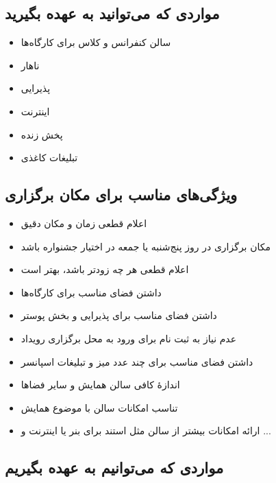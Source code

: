\documentclass{article}
\begin{document}
\subsection{مواردی که می‌توانید به عهده بگیرید}


\begin{flushright}

\begin{itemize}
\item سالن کنفرانس و کلاس برای کارگاه‌ها
\item ناهار
\item پذیرایی
\item اینترنت
\item پخش زنده
\item تبلیغات کاغذی
\end{itemize}

\end{flushright}


\subsection{ویژگی‌های مناسب برای مکان برگزاری}


\begin{flushright}

\begin{itemize}
\item  اعلام قطعی زمان و مکان دقیق
\item مکان برگزاری در روز پنج‌شنبه یا جمعه در اختیار جشنواره باشد
\item اعلام قطعی هر چه زودتر باشد، بهتر است
\item داشتن فضای مناسب برای کارگاه‌ها
\item داشتن فضای مناسب برای پذیرایی و بخش پوستر
\item عدم نیاز به ثبت نام برای ورود به محل برگزاری رویداد
\item داشتن فضای مناسب برای چند عدد میز و تبلیغات اسپانسر
\item اندازهٔ کافی سالن همایش و سایر فضاها
\item تناسب امکانات سالن با موضوع همایش
\item ارائه امکانات بیشتر از سالن مثل استند برای بنر یا اینترنت و ... 
\end{itemize}

\end{flushright}


\subsection{مواردی که می‌توانیم به عهده بگیریم}
\end{document}
